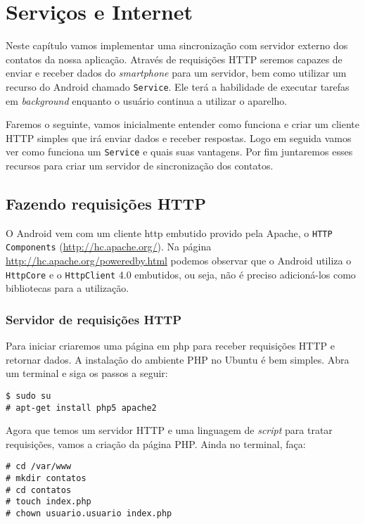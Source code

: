 \chapter{Serviços e Internet}

Neste capítulo vamos implementar uma sincronização com servidor externo
dos contatos da nossa aplicação. Através de requisições HTTP seremos
capazes de enviar e receber dados do \emph{smartphone} para um servidor,
bem como utilizar um recurso do Android chamado \texttt{Service}. Ele
terá a habilidade de executar tarefas em \emph{background} enquanto o
usuário continua a utilizar o aparelho.

Faremos o seguinte, vamos inicialmente entender como funciona e criar um
cliente HTTP simples que irá enviar dados e receber respostas. Logo em
seguida vamos ver como funciona um \texttt{Service} e quais suas
vantagens. Por fim juntaremos esses recursos para criar um servidor de
sincronização dos contatos.

\section{Fazendo requisições HTTP}

O Android vem com um cliente http embutido provido pela Apache, o
\texttt{HTTP Components} (\url{http://hc.apache.org/}). Na página
\url{http://hc.apache.org/poweredby.html} podemos observar que o Android
utiliza o \texttt{HttpCore} e o \texttt{HttpClient} 4.0 embutidos, ou
seja, não é preciso adicioná-los como bibliotecas para a utilização.

\subsection{Servidor de requisições HTTP}

Para iniciar criaremos uma página em php para receber requisições HTTP e
retornar dados. A instalação do ambiente PHP no Ubuntu é bem simples.
Abra um terminal e siga os passos a seguir:

\begin{verbatim}
$ sudo su
# apt-get install php5 apache2
\end{verbatim}
Agora que temos um servidor HTTP e uma linguagem de \emph{script} para
tratar requisições, vamos a criação da página PHP. Ainda no terminal,
faça:

\begin{verbatim}
# cd /var/www
# mkdir contatos
# cd contatos
# touch index.php
# chown usuario.usuario index.php
\end{verbatim}
